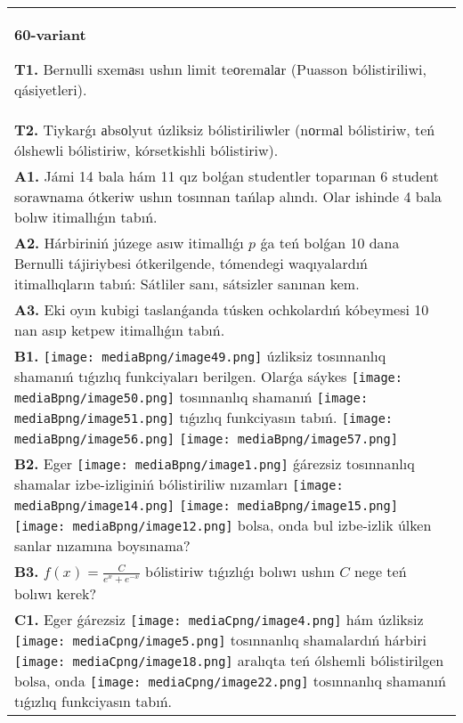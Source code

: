 \documentclass{article}
\begin{document}
\begin{tabular}{m{17cm}}
\textbf{60-variant}
\newline

\textbf{T1.} Bernulli sxemаsı ushın limit teоremаlаr (Puasson bólistiriliwi, qásiyetleri).
 \\
\textbf{T2.} Tiykarǵı аbsоlyut úzliksiz bólistiriliwler (nоrmаl bólistiriw, teń ólshewli bólistiriw, kórsetkishli bólistiriw). 
 \\
\textbf{A1.} Jámi 14 bala hám 11 qız bolǵan studentler toparınan 6 student sorawnama ótkeriw ushın tosınnan tańlap alındı. Olar ishinde 4 bala bolıw itimallıǵın tabıń.
 \\
\textbf{A2.} Hárbiriniń júzege asıw itimallıǵı $p$ ǵa teń bolǵan 10 dana Bernulli tájiriybesi ótkerilgende, tómendegi waqıyalardıń itimallıqların tabıń: Sátliler sanı, sátsizler sanınan kem.
 \\
\textbf{A3.} Eki oyın kubigi taslanǵanda túsken ochkolardıń kóbeymesi 10 nan asıp ketpew itimallıǵın tabıń.
 \\
\textbf{B1.} \texttt{[image: mediaBpng/image49.png]} úzliksiz tosınnanlıq shamanıń tıǵızlıq funkciyaları berilgen. Olarǵa sáykes \texttt{[image: mediaBpng/image50.png]} tosınnanlıq shamanıń \texttt{[image: mediaBpng/image51.png]} tıǵızlıq funkciyasın tabıń. \texttt{[image: mediaBpng/image56.png]} \texttt{[image: mediaBpng/image57.png]}
 \\
\textbf{B2.} Eger \texttt{[image: mediaBpng/image1.png]} ǵárezsiz tosınnanlıq shamalar izbe-izliginiń bólistiriliw nızamları
\texttt{[image: mediaBpng/image14.png]} \texttt{[image: mediaBpng/image15.png]} \texttt{[image: mediaBpng/image12.png]}
bolsa, onda bul izbe-izlik úlken sanlar nızamına boysınama?
 \\
\textbf{B3.} \(f(x) = \frac{C}{e^{x} + e^{- x}}\) bólistiriw tıǵızlıǵı bolıwı ushın \(C\) nege teń bolıwı kerek?
 \\
\textbf{C1.} Eger ǵárezsiz \texttt{[image: mediaCpng/image4.png]} hám úzliksiz \texttt{[image: mediaCpng/image5.png]} tosınnanlıq shamalardıń hárbiri \texttt{[image: mediaCpng/image18.png]} aralıqta teń ólshemli bólistirilgen bolsa, onda \texttt{[image: mediaCpng/image22.png]} tosınnanlıq shamanıń tıǵızlıq funkciyasın tabıń.

\end{tabular}
\end{document}
